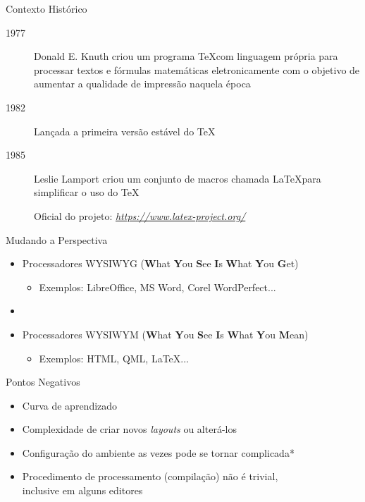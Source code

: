 \begin{frame}{Contexto Histórico}
    \begin{description}
        \item[1977] Donald E. Knuth criou um programa \TeX com linguagem própria para processar textos e fórmulas matemáticas eletronicamente com o objetivo de aumentar a qualidade de impressão naquela época
        \item[1982] Lançada a primeira versão estável do \TeX
        \item[1985] Leslie Lamport criou um conjunto de macros chamada \LaTeX para simplificar o uso do \TeX
        \item[]
        \item[] Oficial do projeto: \textit{\url{https://www.latex-project.org/}}
    \end{description}
    
    
\end{frame}
%

\begin{frame}{Mudando a Perspectiva}
    \begin{itemize}
        \item Processadores WYSIWYG (\textbf{W}hat \textbf{Y}ou \textbf{S}ee \textbf{I}s \textbf{W}hat \textbf{Y}ou \textbf{G}et)
        \begin{itemize}
            \item Exemplos: LibreOffice, MS Word, Corel WordPerfect...
        \end{itemize}
        \item[]
        \item Processadores WYSIWYM (\textbf{W}hat \textbf{Y}ou \textbf{S}ee \textbf{I}s \textbf{W}hat \textbf{Y}ou \textbf{M}ean)
        \begin{itemize}
            \item Exemplos: HTML, QML, \LaTeX...
        \end{itemize}
    \end{itemize}
\end{frame}
%

\begin{frame}{Pontos Negativos}
    \begin{itemize}
        \item Curva de aprendizado
        \item Complexidade de criar novos \textit{layouts} ou alterá-los
        \item Configuração do ambiente as vezes pode se tornar complicada*
        \item Procedimento de processamento (compilação) não é trivial,\\ inclusive em alguns editores
    \end{itemize}
\end{frame}


